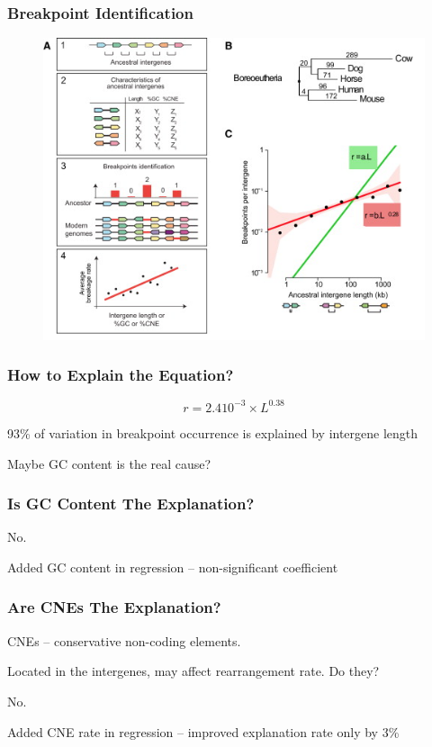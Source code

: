 \documentclass[svgnames,14pt]{beamer}
\begin{document}
\begin{frame}
\frametitle{Breakpoint Identification}
\begin{figure}
	\centering
	\includegraphics[scale = .75]{Breakpoint.png}
\end{figure}
\end{frame}

\begin{frame}
\frametitle{How to Explain the Equation?}
$$r = 2.4 10^{-3} \times L ^ {0.38}$$

93\% of variation in breakpoint occurrence is explained by intergene length

\vspace{12pt}
Maybe GC content is the real cause?
\end{frame}

\begin{frame}
\frametitle{Is GC Content The Explanation?}
No.
\vspace{12pt}

\pause
Added GC content in regression -- non-significant coefficient
\end{frame}

\begin{frame}
\frametitle{Are CNEs The Explanation?}
CNEs -- conservative non-coding elements.

Located in the intergenes, may affect rearrangement rate.
Do they?
\vspace{12pt}

\pause
No.
\vspace{12pt}

\pause
Added CNE rate in regression -- improved explanation rate only by 3\%
\end{frame}
\end{document}
